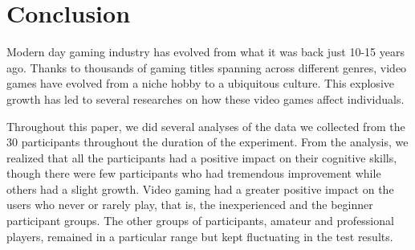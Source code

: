 \documentclass[conference]{IEEEtran}
\begin{document}
\section{Conclusion}
\begin{flushleft}
Modern day gaming industry has evolved from what it was back just 10-15 years ago. Thanks to thousands of gaming titles spanning across different genres, video games have evolved from a niche hobby to a ubiquitous culture. This explosive growth has led to several researches on how these video games affect individuals. 

Throughout this paper, we did several analyses of the data we collected from the 30 participants throughout the duration of the experiment. From the analysis, we realized that all the participants had a positive impact on their cognitive skills, though there were few participants who had tremendous improvement while others had a slight growth. Video gaming had a greater positive impact on the users who never or rarely play, that is, the inexperienced and the beginner participant groups. The other groups of participants, amateur and professional players, remained in a particular range but kept fluctuating in the test results. 
    
\end{flushleft}
\end{document}
